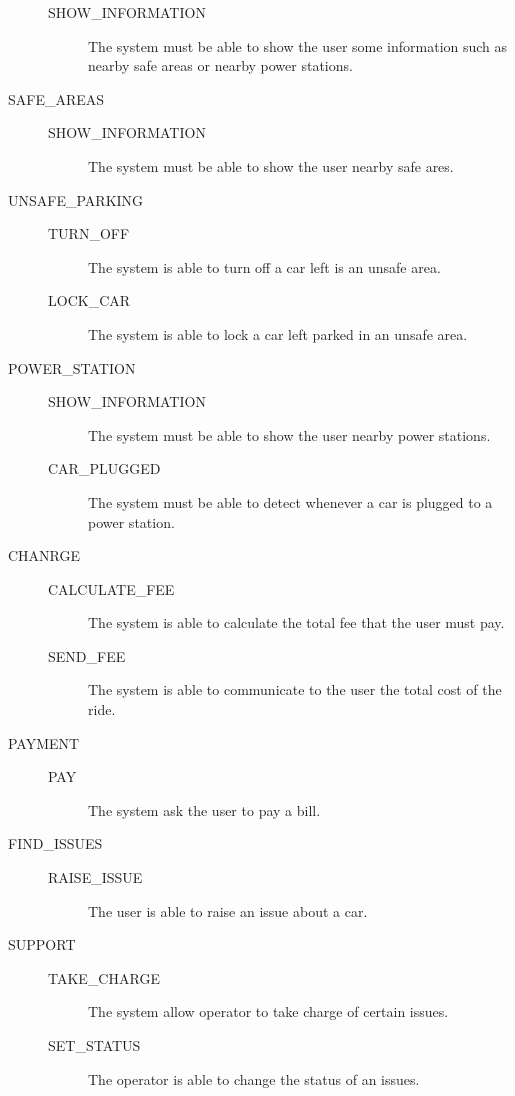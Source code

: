 \documentclass[11pt]{article} %
\begin{document}
\begin{description}
\begin{description}
			\item[SHOW\_INFORMATION] The system must be able to show the user some information such as nearby safe areas or nearby power stations.
		\end{description}
	\item[SAFE\_AREAS] \hfill
		\begin{description}
			\item[SHOW\_INFORMATION] The system must be able to show the user nearby safe ares.
		\end{description}
	\item[UNSAFE\_PARKING] \hfill
		\begin{description}
			\item[TURN\_OFF] The system is able to turn off a car left is an unsafe area.
			\item[LOCK\_CAR] The system is able to lock a car left parked in an unsafe area.
		\end{description}
	\item[POWER\_STATION] \hfill
		\begin{description}
			\item[SHOW\_INFORMATION] The system must be able to show the user nearby power stations.
			\item[CAR\_PLUGGED] The system must be able to detect whenever a car is plugged to a power station.
		\end{description}
	\item[CHANRGE] \hfill
		\begin{description}
			\item[CALCULATE\_FEE] The system is able to calculate the total fee that the user must pay.
			\item[SEND\_FEE] The system is able to communicate to the user the total cost of the ride.
		\end{description}
	\item[PAYMENT] \hfill
		\begin{description}
			\item[PAY] The system ask the user to pay a bill.
		\end{description}
	\item[FIND\_ISSUES] \hfill
		\begin{description}
			\item[RAISE\_ISSUE] The user is able to raise an issue about a car.
		\end{description}
	\item[SUPPORT] \hfill
		\begin{description}
			\item[TAKE\_CHARGE] The system allow operator to take charge of certain issues.
			\item[SET\_STATUS] The operator is able to change the status of an issues.
		\end{description}
\end{description}
\end{document}
